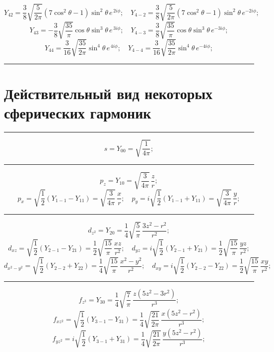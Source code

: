 \[\textit{Y}_{42}=\frac{3}{8}\sqrt{\frac{5}{2\pi}}\left(7\cos^2{\theta}-1 \right) \sin^2{\theta}\, e^{\,2i\phi};\quad \textit{Y}_{4-2}=\frac{3}{8}\sqrt{\frac{5}{2\pi}}\left(7\cos^2{\theta}-1 \right) \sin^2{\theta}\, e^{-2i\phi};
\]\hspace{\parindent}
\[\textit{Y}_{43}=-\frac{3}{8}\sqrt{\frac{35}{\pi}}\cos{\theta} \sin^3{\theta}\, e^{\,3i\phi};\quad \textit{Y}_{4-3}=\frac{3}{8}\sqrt{\frac{35}{\pi}}\cos{\theta} \sin^3{\theta}\, e^{-3i\phi};
\]\hspace{\parindent}
\[ \textit{Y}_{44}=\frac{3}{16}\sqrt{\frac{35}{2\pi}} \sin^4 {\theta} \, e^{\,4i\phi}; \quad
\textit{Y}_{4-4}=\frac{3}{16}\sqrt{\frac{35}{2\pi}} \sin^4 {\theta} \, e^{-4i\phi};
\]
\rule{\textwidth}{0.4pt}

\section{Действительный вид некоторых сферических гармоник}
\rule{\textwidth}{0.4pt}
\[ s=\textit{Y}_{00}=\sqrt{\frac{1}{4\pi}};\]
\rule{\textwidth}{0.4pt}
\[ p_z=\textit{Y}_{10}=\sqrt{\frac{3}{4\pi}}\,\frac{z}{r}; \] 
\[p_x=\sqrt{\frac{1}{2}}\left(\textit{Y}_{1-1}-\textit{Y}_{11}\right)=\sqrt{\frac{3}{4\pi}}\,\frac{x}{r}; \quad p_y=i\sqrt{\frac{1}{2}}(\textit{Y}_{1-1}+\textit{Y}_{11})=\sqrt{\frac{3}{4\pi}}\,\frac{y}{r}; \]
\rule{\textwidth}{0.4pt}
\[ d_{z^2}=\textit{Y}_{20}=\frac{1}{4}\sqrt{\frac{5}{\pi}}\,\frac{3z^2-r^2}{r^2}; \] 
\[d_{xz}=\sqrt{\frac{1}{2}}(\textit{Y}_{2-1}-\textit{Y}_{21})=\frac{1}{2}\sqrt{\frac{15}{\pi}}\,\frac{xz}{r^2}; \quad d_{yz}=i\sqrt{\frac{1}{2}}(\textit{Y}_{2-1}+\textit{Y}_{21})=\frac{1}{2}\sqrt{\frac{15}{\pi}}\,\frac{yz}{r^2}; \]\hspace{\parindent}
\[d_{x^2-y^2}=\sqrt{\frac{1}{2}}(\textit{Y}_{2-2}+\textit{Y}_{22})=\frac{1}{4}\sqrt{\frac{15}{\pi}}\,\frac{x^2-y^2}{r^2}; \quad d_{xy}=i\sqrt{\frac{1}{2}}(\textit{Y}_{2-2}-\textit{Y}_{22})=\frac{1}{2}\sqrt{\frac{15}{\pi}}\,\frac{xy}{r^2}; \]
\rule{\textwidth}{0.4pt}
\[ f_{z^3}=\textit{Y}_{30}=\frac{1}{4}\sqrt{\frac{7}{\pi}}\,\frac{z(5z^2-3r^2)}{r^3}; \] 
\[f_{xz^2}=\sqrt{\frac{1}{2}}(\textit{Y}_{3-1}-\textit{Y}_{31})=\frac{1}{4}\sqrt{\frac{21}{2\pi}}\,\frac{x(5z^2-r^2)}{r^3}; \]\hspace{\parindent}
\[ f_{yz^2}=i\sqrt{\frac{1}{2}}(\textit{Y}_{3-1}+\textit{Y}_{31})=\frac{1}{4}\sqrt{\frac{21}{2\pi}}\,\frac{y(5z^2-r^2)}{r^3}; \]\hspace{\parindent}
